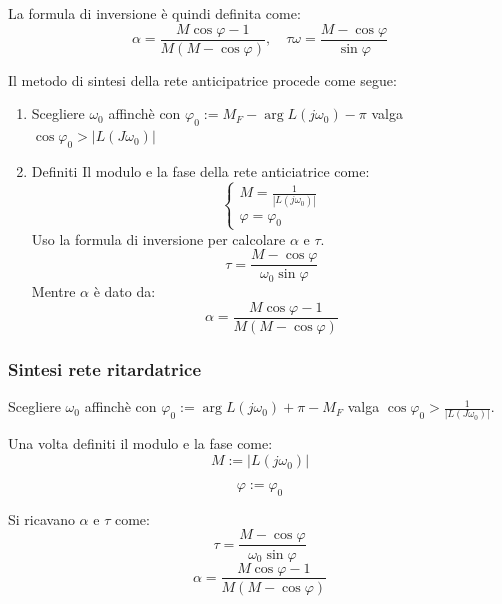 La formula di inversione è quindi definita come:
\begin{equation}
  \alpha = \frac{M \cos \varphi - 1}{M(M - \cos \varphi)}, \quad \tau \omega = \frac{M - \cos \varphi}{\sin \varphi}
\end{equation}


Il metodo di sintesi della rete anticipatrice procede come segue:
\begin{enumerate}
  \item Scegliere $\omega_0$ affinchè con  $\varphi_0 := M_F - \arg L(j\omega_0) - \pi$
    valga $\cos \varphi_0 > | L(J\omega_0) |$

  \item Definiti Il modulo e la fase della rete anticiatrice come:
    \begin{equation}
      \begin{cases}
        M = \frac{1}{| L(j\omega_0) |} \\
        \varphi = \varphi_0
      \end{cases}
    \end{equation}
    Uso la formula di inversione per calcolare $\alpha$ e $\tau$.
    \begin{equation}
      \tau = \frac{M - \cos \varphi}{\omega_0 \sin \varphi}
    \end{equation}
    Mentre $\alpha$ è dato da:
    \begin{equation}
      \alpha = \frac{M \cos \varphi - 1}{M(M - \cos \varphi)}
    \end{equation}
\end{enumerate}




\subsubsection{Sintesi rete ritardatrice}
Scegliere $\omega_0$ affinchè con  $\varphi_0 := \arg L(j\omega_0) + \pi - M_F$
valga $\cos \varphi_0 > \frac{1}{| L(J\omega_0) |}$.

Una volta definiti il modulo e la fase come:
\begin{equation}
  M := | L(j\omega_0) |
\end{equation}

\begin{equation}
  \varphi := \varphi_0
\end{equation}


Si ricavano $\alpha$ e $\tau$ come:
\begin{equation}
  \tau = \frac{M - \cos \varphi}{\omega_0 \sin \varphi}
\end{equation}
\begin{equation}
  \alpha = \frac{M \cos \varphi - 1}{M(M - \cos \varphi)}
\end{equation}



